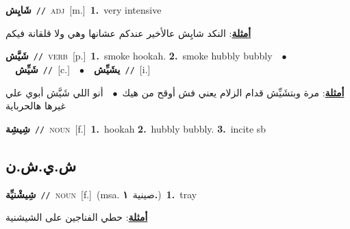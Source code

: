\documentclass[10pt,a4paper,twoside]{article} %
\begin{document}
\begin{multicols}{2}
{\setlength\topsep{0pt}\textbf{\foreignlanguage{arabic}{شَايِش}}\ {\color{gray}\texttt{//}\color{black}}\ \textsc{adj}\ [m.]\ \textbf{1.}~very intensive\  \begin{flushright}\color{gray}\foreignlanguage{arabic}{\textbf{\underline{\foreignlanguage{arabic}{أمثلة}}}: النكد شايِش عالأخير عندكم عشانها وهي ولا قلقانة فيكم}\end{flushright}\color{black}} \vspace{2mm}

{\setlength\topsep{0pt}\textbf{\foreignlanguage{arabic}{شَيَّش}}\ {\color{gray}\texttt{//}\color{black}}\ \textsc{verb}\ [p.]\ \textbf{1.}~smoke hookah.  \textbf{2.}~smoke hubbly bubbly\ \ $\bullet$\ \ \setlength\topsep{0pt}\textbf{\foreignlanguage{arabic}{شَيِّش}}\ {\color{gray}\texttt{//}\color{black}}\ [c.]\ \ $\bullet$\ \ \setlength\topsep{0pt}\textbf{\foreignlanguage{arabic}{يشَيِّش}}\ {\color{gray}\texttt{//}\color{black}}\ [i.]\  \begin{flushright}\color{gray}\foreignlanguage{arabic}{\textbf{\underline{\foreignlanguage{arabic}{أمثلة}}}: مرة وبتشَيِّش قدام الزلام يعني فش أوقح من هيك\ $\bullet$\ \  أنو اللي شَيَّش أبوي علي غيرها هالحرباية}\end{flushright}\color{black}} \vspace{2mm}

{\setlength\topsep{0pt}\textbf{\foreignlanguage{arabic}{شِيشِة}}\ {\color{gray}\texttt{//}\color{black}}\ \textsc{noun}\ [f.]\ \textbf{1.}~hookah  \textbf{2.}~hubbly bubbly.  \textbf{3.}~incite sb\ } \vspace{2mm}

\vspace{-3mm}
\subsection*{\color{blue}\foreignlanguage{arabic}{ش.ي.ش.ن}\color{blue}{ (ntws)}} 

{\setlength\topsep{0pt}\textbf{\foreignlanguage{arabic}{شِيشْنيِّة}}\ {\color{gray}\texttt{//}\color{black}}\ \textsc{noun}\ [f.]\ \color{gray}(msa. \foreignlanguage{arabic}{صينية}~\foreignlanguage{arabic}{\textbf{١.}})\color{black}\ \textbf{1.}~tray\  \begin{flushright}\color{gray}\foreignlanguage{arabic}{\textbf{\underline{\foreignlanguage{arabic}{أمثلة}}}: حطي الفناجين على الشيشنية}\end{flushright}\color{black}} \vspace{2mm}


\end{multicols}
\end{document}
